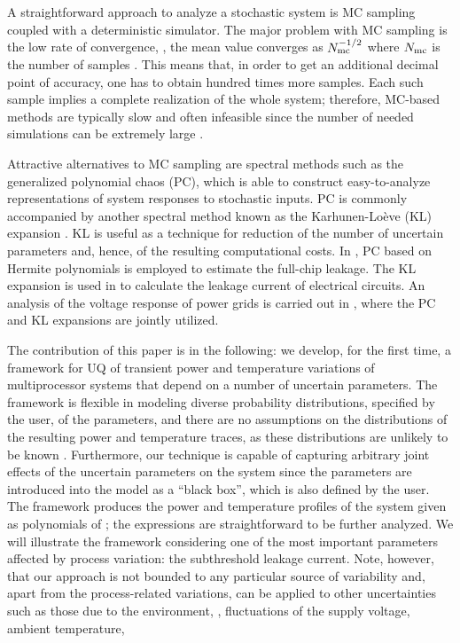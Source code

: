 
A straightforward approach to analyze a stochastic system is MC sampling coupled with a deterministic simulator.
The major problem with MC sampling is the low rate of convergence, \eg, the mean value converges as $N_\text{mc}^{-{{1}/{2}}}$ where $N_\text{mc}$ is the number of samples \cite{xiu2010, maitre2010}.
This means that, in order to get an additional decimal point of accuracy, one has to obtain hundred times more samples.
Each such sample implies a complete realization of the whole system; therefore, MC-based methods are typically slow and often infeasible since the number of needed simulations can be extremely large \cite{diaz-emparanza2002}.

Attractive alternatives to MC sampling are spectral methods \cite{xiu2010, maitre2010} such as the generalized polynomial chaos (PC), which is able to construct easy-to-analyze representations of system responses to stochastic inputs.
PC is commonly accompanied by another spectral method known as the Karhunen-Lo\`{e}ve (KL) expansion \cite{ghanem1991}. KL is useful as a technique for reduction of the number of uncertain parameters and, hence, of the resulting computational costs.
In \cite{shen2009}, PC based on Hermite polynomials is employed to estimate the full-chip leakage.
The KL expansion is used in \cite{bhardwaj2006} to calculate the leakage current of electrical circuits.
An analysis of the voltage response of power grids is carried out in \cite{ghanta2006}, where the PC and KL expansions are jointly utilized.

The contribution of this paper is in the following: we develop, for the first time, a framework for UQ of transient power and temperature variations of multiprocessor systems that depend on a number of uncertain parameters.
The framework is flexible in modeling diverse probability distributions, specified by the user, of the parameters, and there are no assumptions on the distributions of the resulting power and temperature traces, as these distributions are unlikely to be known \apriori.
Furthermore, our technique is capable of capturing arbitrary joint effects of the uncertain parameters on the system since the parameters are introduced into the model as a ``black box'', which is also defined by the user.
The framework produces the power and temperature profiles of the system given as polynomials of \rvs; the expressions are straightforward to be further analyzed. We will illustrate the framework considering one of the most important parameters affected by process variation: the subthreshold leakage current.
Note, however, that our approach is not bounded to any particular source of variability and, apart from the process-related variations, can be applied to other uncertainties such as those due to the environment, \ie, fluctuations of the supply voltage, ambient temperature, \etc
